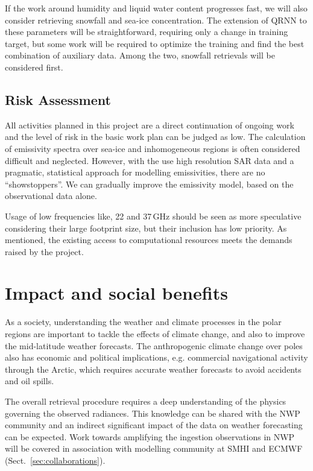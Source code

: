 \documentclass[12pt,oneside,a4paper]{article}
\begin{document}
If the work around humidity and liquid water content progresses fast, we will
also consider retrieving snowfall and sea-ice concentration. The extension of
QRNN to these parameters will be straightforward, requiring only a change in
training target, but some work will be required to optimize the training and
find the best combination of auxiliary data. Among the two, snowfall retrievals
will be considered first.
%
 
\subsection{Risk Assessment}
%
\label{sec:risk}
All activities planned in this project are a direct continuation of ongoing
work and the level of risk in the basic work plan can be judged as low. The
calculation of emissivity spectra over sea-ice and inhomogeneous regions is
often considered difficult and neglected. However, with the use high resolution SAR
data and a pragmatic, statistical approach for modelling emissivities,
there are no ``showstoppers''. We can gradually improve the emissivity model,
based on the observational data alone. 

Usage of low frequencies like, 22 and 37\,GHz should be seen as more
speculative considering their large footprint size, but their inclusion has low
priority. As mentioned, the existing access to computational resources meets
the demands raised by the project.


\section{Impact and social benefits}
%
\label{sec:impact}

As a society, understanding the weather and climate processes in the polar
regions are important to tackle the effects of climate change, and also to
improve the mid-latitude weather forecasts. The anthropogenic climate change over
poles also has economic and political implications, e.g. commercial
navigational activity through the Arctic, which requires accurate weather
forecasts to avoid accidents and oil spills.

The overall retrieval procedure requires a deep understanding of the physics
governing the observed radiances. This knowledge can be shared with the NWP community and an indirect significant impact of the data on weather forecasting can be expected. Work towards amplifying the ingestion observations in NWP will be covered in association with modelling community at SMHI and ECMWF (Sect.~\ref{sec:collaborations}).
\end{document}
